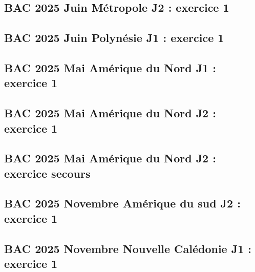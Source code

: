 \documentclass[lang=fr,edition=teacher,layout=sheet]{mxbook}
\begin{document}
\begingroup\endgroup
\par\bigskip
{}\subsection*{BAC 2025 Juin Métropole J2 : exercice 1}
\begingroup\endgroup
\par\bigskip
{}\subsection*{BAC 2025 Juin Polynésie J1 : exercice 1}
\begingroup\endgroup
\par\bigskip
{}\subsection*{BAC 2025 Mai Amérique du Nord J1 : exercice 1}
\begingroup\endgroup
\par\bigskip
{}\subsection*{BAC 2025 Mai Amérique du Nord J2 : exercice 1}
\begingroup\endgroup
\par\bigskip
{}\subsection*{BAC 2025 Mai Amérique du Nord J2 : exercice secours}
\begingroup\endgroup
\par\bigskip
{}\subsection*{BAC 2025 Novembre Amérique du sud J2 : exercice 1}
\begingroup\endgroup
\par\bigskip
{}\subsection*{BAC 2025 Novembre Nouvelle Calédonie J1 : exercice 1}
\end{document}
